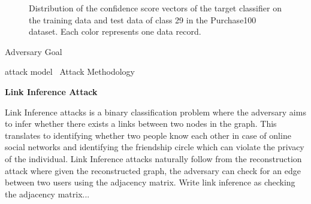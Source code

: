 \begin{figure}[!htb]
    \centering
    \begin{minipage}[b]{1\linewidth}
    \centering


    \end{minipage}
    \caption{Distribution of the confidence score vectors of the target classifier on the training data and test data of class 29 in the Purchase100 dataset. Each color represents one data record.}
    \label{fig:recattack}
\end{figure}

Adversary Goal

attack model~\cite{gae,vgae}
Attack Methodology

\textbf{Link Inference Attack}

Link Inference attacks is a binary classification problem where the adversary aims to infer whether there exists a links between two nodes in the graph.
This translates to identifying whether two people know each other in case of online social networks and identifying the friendship circle which can violate the privacy of the individual.
Link Inference attacks naturally follow from the reconstruction attack where given the reconstructed graph, the adversary can check for an edge between two users using the adjacency matrix.
Write link inference as checking the adjacency matrix...


